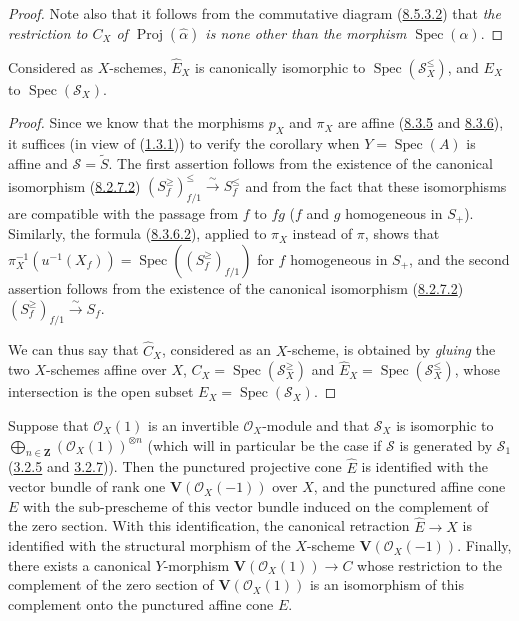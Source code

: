\begin{proof}
Note also that it follows from the commutative diagram
(\hyperref[II.8.5.3.2]{8.5.3.2}) that \emph{the restriction to $C_X$ of
$\operatorname{Proj}(\widehat{\alpha})$ is none other than the morphism
$\operatorname{Spec}(\alpha)$}.
\end{proof}

\begin{corollary}[8.6.3]
\label{II.8.6.3}
Considered as $X$-schemes, $\widehat{E}_X$ is canonically isomorphic to
$\operatorname{Spec}(\mathcal{S}_X^{\leq})$, and $E_X$ to
$\operatorname{Spec}(\mathcal{S}_X)$.
\end{corollary}

\begin{proof}
Since we know that the morphisms $p_X$ and $\pi_X$ are affine
(\hyperref[II.8.3.5]{8.3.5} and
\hyperref[II.8.3.6]{8.3.6}), it suffices (in view of
(\hyperref[II.1.3.1]{1.3.1})) to verify the corollary when
$Y=\operatorname{Spec}(A)$ is affine and $\mathcal{S}=\widetilde{S}$. The
first assertion follows from the existence of the canonical isomorphism
(\hyperref[II.8.2.7.2]{8.2.7.2})
$(S_f^{\geq})_{f/1}^{\leq}\xrightarrow{\sim}S_f^{\leq}$ and from the fact that these
isomorphisms are compatible with the passage from $f$ to $fg$ ($f$ and $g$
homogeneous in $S_+$). Similarly, the formula
(\hyperref[II.8.3.6.2]{8.3.6.2}), applied to $\pi_X$ instead of $\pi$,
shows that
$\pi_X^{-1}(u^{-1}(X_f))=
\operatorname{Spec}((S_f^{\geq})_{f/1})$ for $f$ homogeneous in $S_+$, and the
second assertion follows from the existence of the canonical isomorphism
(\hyperref[II.8.2.7.2]{8.2.7.2})
$(S_f^{\geq})_{f/1}\xrightarrow{\sim}S_f$.

We can thus say that $\widehat{C}_X$, considered as an $X$-scheme, is obtained
by \emph{gluing} the two $X$-schemes affine over $X$,
$C_X=\operatorname{Spec}(\mathcal{S}_X^{\geq})$ and
$\widehat{E}_X=\operatorname{Spec}(\mathcal{S}_X^{\leq})$, whose
intersection is the open subset $E_X=\operatorname{Spec}(\mathcal{S}_X)$.
\end{proof}

\begin{corollary}[8.6.4]
\label{II.8.6.4}
Suppose that $\mathcal{O}_X(1)$ is an invertible $\mathcal{O}_X$-module and
that $\mathcal{S}_X$ is isomorphic to
$\bigoplus_{n\in\mathbf{Z}}(\mathcal{O}_X(1))^{\otimes n}$ (which will in
particular be the case if $\mathcal{S}$ is generated by $\mathcal{S}_1$
(\hyperref[II.3.2.5]{3.2.5} and
\hyperref[II.3.2.7]{3.2.7})). Then the punctured projective cone
$\widehat{E}$ is identified with the vector bundle of rank one
$\mathbf{V}(\mathcal{O}_X(-1))$ over $X$, and the punctured affine cone $E$ with the
sub-prescheme of this vector bundle induced on the complement of the
zero section. With this identification, the canonical retraction
$\widehat{E}\to X$ is identified with the structural morphism of the $X$-scheme
$\mathbf{V}(\mathcal{O}_X(-1))$. Finally, there exists a canonical $Y$-morphism
$\mathbf{V}(\mathcal{O}_X(1))\to C$ whose restriction to the complement of
the zero section of $\mathbf{V}(\mathcal{O}_X(1))$ is an isomorphism of this
complement onto the punctured affine cone $E$.
\end{corollary}

